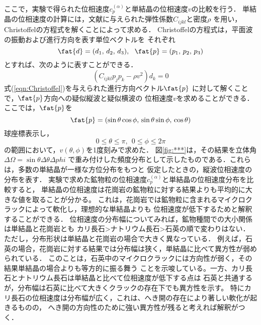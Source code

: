ここで，実験で得られた位相速度$c_p^{(\alpha)}$と単結晶の位相速度$v$の比較を行う．
単結晶の位相速度の計算には，文献に与えられた弾性係数$C_{ijkl}$と密度$\rho$
を用い，Christoffelの方程式を解くことによって求める．
Christoffelの方程式は，平面波の振動および進行方向を表す単位ベクトルを
それぞれ
\begin{equation}
	\fat{d}=(d_1,\, d_2,\, d_3), \ \ 
	\fat{p}=(p_1,\, p_2,\, p_3)
	\label{eqn:unit_vecs}
\end{equation}
とすれば、次のように表すことができる．
\begin{equation}
	\left( C_{ijkl}p_j p_k - \rho v^2 \right)d_k=0
	\label{eqn:Christoffel}
\end{equation}
式(\ref{eqn:Christoffel})を与えられた進行方向ベクトル$\fat{p}$
に対して解くことで，$\fat{p}$方向への疑似縦波と疑似横波の
位相速度$v$を求めることができる．ここでは，$\fat{p}$を
\begin{equation}
	\fat{p}=\left(
		\sin\theta \cos\phi, \,
		\sin\theta \sin\phi, \,
		\cos\theta
	\right)
	\label{eqn:p_polar}
\end{equation}
球座標表示し，
\begin{equation}
	0 \leq \theta \leq \pi, \ \ 
	0 \leq \phi \leq 2\pi
	\label{eqn:}
\end{equation}
の範囲において，$v(\theta, \phi)$を1度刻みで求めた．
図\ref{fig:***}は，その結果を立体角$\Delta \Omega = \sin\theta \Delta \theta \Delta phi$
で重み付けした頻度分布として示したものである．これらは，多数の単結晶が一様な方位分布をもつと
仮定したときの，縦波位相速度の分布を表す．
実験で求めた鉱物粒の位相速度$c^{(\alpha)}_p$と単結晶の位相速度分布を比較すると，
単結晶の位相速度は花崗岩の鉱物粒に対する結果よりも平均的に大きな値を取ることが分かる。
これは，花崗岩では鉱物粒に含まれるマイクロクラックによって軟化し，理想的な単結晶よりも
位相速度が低下するためと解釈することができる．
位相速度の分布幅についてみれば，鉱物種間での大小関係は単結晶と花崗岩とも
カリ長石>ナトリウム長石>石英の順で変わりはない．
ただし，分布形状は単結晶と花崗岩の場合で大きく異なっている．
例えば，石英の場合，花崗岩に対する結果では分布幅は狭く，単結晶に比べて異方性が弱められている．
このことは，石英中のマイクロクラックには方向性が弱く，その結果単結晶の場合よりも等方的に振る舞う
ことを示唆している。一方、カリ長石とナトリウム長石は単結晶と比べて位相速度が低下する点は
石英と共通するが，分布幅は石英に比べて大きくクラックの存在下でも異方性を示す。
特にカリ長石の位相速度は分布幅が広く，これは、へき開の存在により著しい軟化が起きるものの，
へき開の方向性のために強い異方性が残ると考えれば解釈がつく．
